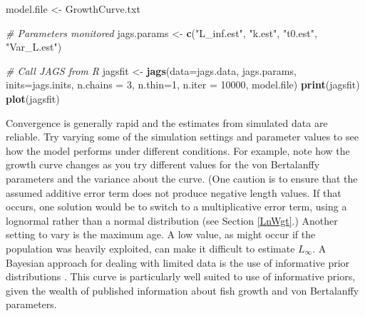 \documentclass[
]{krantz}
\makeatletter
\newenvironment{Shaded}{\begin{snugshade}}{\end{snugshade}}
\newcommand{\AttributeTok}[1]{\textcolor[rgb]{0.27,0.27,0.27}{#1}}
\newcommand{\CommentTok}[1]{\textcolor[rgb]{0.37,0.37,0.37}{\textit{#1}}}
\newcommand{\DecValTok}[1]{\textcolor[rgb]{0.06,0.06,0.06}{#1}}
\newcommand{\FunctionTok}[1]{\textcolor[rgb]{0.27,0.27,0.27}{\textbf{#1}}}
\newcommand{\NormalTok}[1]{#1}
\newcommand{\OtherTok}[1]{\textcolor[rgb]{0.37,0.37,0.37}{#1}}
\newcommand{\StringTok}[1]{\textcolor[rgb]{0.5,0.5,0.5}{#1}}
\newenvironment{kframe}{%
\medskip{}
\setlength{\fboxsep}{.8em}
 \def\at@end@of@kframe{}%
 \ifinner\ifhmode%
  \def\at@end@of@kframe{\end{minipage}}%
  \begin{minipage}{\columnwidth}%
 \fi\fi%
 \def\FrameCommand##1{\hskip\@totalleftmargin \hskip-\fboxsep
 \colorbox{shadecolor}{##1}\hskip-\fboxsep
     \hskip-\linewidth \hskip-\@totalleftmargin \hskip\columnwidth}%
 \MakeFramed {\advance\hsize-\width
   \@totalleftmargin\z@ \linewidth\hsize
   \@setminipage}}%
 {\par\unskip\endMakeFramed%
 \at@end@of@kframe}
\renewenvironment{Shaded}{\begin{kframe}}{\end{kframe}}
\makeatother
\begin{document}
\begin{Shaded}
\begin{Highlighting}[]
\NormalTok{model.file }\OtherTok{\textless{}{-}} \StringTok{\textquotesingle{}GrowthCurve.txt\textquotesingle{}}

\CommentTok{\# Parameters monitored}
\NormalTok{jags.params }\OtherTok{\textless{}{-}} \FunctionTok{c}\NormalTok{(}\StringTok{"L\_inf.est"}\NormalTok{, }\StringTok{"k.est"}\NormalTok{, }\StringTok{"t0.est"}\NormalTok{, }\StringTok{"Var\_L.est"}\NormalTok{)}

\CommentTok{\# Call JAGS from R}
\NormalTok{jagsfit }\OtherTok{\textless{}{-}} \FunctionTok{jags}\NormalTok{(}\AttributeTok{data=}\NormalTok{jags.data, jags.params, }\AttributeTok{inits=}\NormalTok{jags.inits,}
                \AttributeTok{n.chains =} \DecValTok{3}\NormalTok{, }\AttributeTok{n.thin=}\DecValTok{1}\NormalTok{, }\AttributeTok{n.iter =} \DecValTok{10000}\NormalTok{,}
\NormalTok{                model.file)}
\FunctionTok{print}\NormalTok{(jagsfit)}
\FunctionTok{plot}\NormalTok{(jagsfit)}
\end{Highlighting}
\end{Shaded}

Convergence is generally rapid and the estimates from simulated data are reliable. Try varying some of the simulation settings and parameter values to see how the model performs under different conditions. For example, note how the growth curve changes as you try different values for the von Bertalanffy parameters and the variance about the curve. (One caution is to ensure that the assumed additive error term does not produce negative length values. If that occurs, one solution would be to switch to a multiplicative error term, using a lognormal rather than a normal distribution (see Section \ref{LnWgt}.) Another setting to vary is the maximum age. A low value, as might occur if the population was heavily exploited, can make it difficult to estimate \(L_\infty\). A Bayesian approach for dealing with limited data is the use of informative prior distributions \citep{doll.jacquemin_2018}. This curve is particularly well suited to use of informative priors, given the wealth of published information about fish growth and von Bertalanffy parameters.
\end{document}
